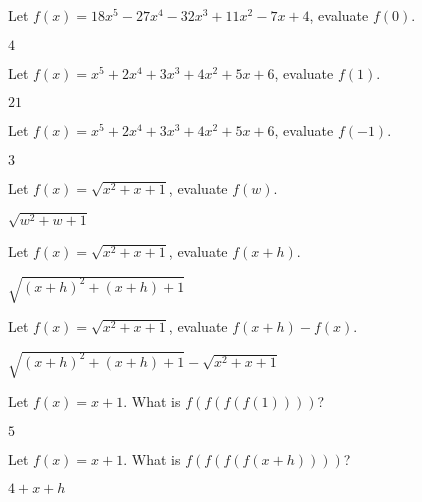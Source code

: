 \begin{exercises}
\begin{exercise} Let $f(x) = 18x^5-27x^4-32x^3+11x^2 -7x +4$, evaluate $f(0)$.
\begin{answer}
$4$
\end{answer}
\end{exercise}

\begin{exercise} Let $f(x) = x^5+2x^4+3x^3+4x^2+5x+6$, evaluate $f(1)$.
\begin{answer}
$21$
\end{answer}
\end{exercise}

\begin{exercise} Let $f(x) = x^5+2x^4+3x^3+4x^2+5x+6$, evaluate $f(-1)$.
\begin{answer}
$3$
\end{answer}
\end{exercise}

\begin{exercise} Let $f(x) =\sqrt{x^2+x+1}$, evaluate $f(w)$.
\begin{answer}
$\sqrt{w^2+w+1}$
\end{answer}
\end{exercise}

\begin{exercise} Let $f(x) =\sqrt{x^2+x+1}$, evaluate $f(x+h)$.
\begin{answer}
$\sqrt{(x+h)^2+(x+h)+1}$
\end{answer}
\end{exercise}

\begin{exercise} Let $f(x) = \sqrt{x^2+x+1}$, evaluate $f(x+h) - f(x)$.
\begin{answer}
$\sqrt{(x+h)^2+(x+h)+1} - \sqrt{x^2+x+1}$
\end{answer}
\end{exercise}

\begin{exercise} Let $f(x) = x+1$. What is $f(f(f(f(1))))$?
\begin{answer}
$5$
\end{answer}
\end{exercise}

\begin{exercise} Let $f(x) = x+1$. What is $f(f(f(f(x+h))))$?
\begin{answer}
$4+x+h$
\end{answer}
\end{exercise}


\end{exercises}
